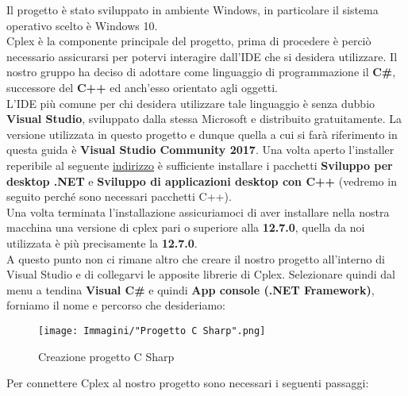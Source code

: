 \documentclass[11pt]{article}
\begin{document}
Il progetto è stato sviluppato in ambiente Windows, in particolare il sistema operativo scelto è Windows 10.\\
Cplex è la componente principale del progetto, prima di procedere è perciò necessario assicurarsi per potervi interagire dall'IDE che si desidera utilizzare. Il nostro gruppo ha deciso di adottare come linguaggio di programmazione il \textbf{C\#}, successore del \textbf{C++} ed anch'esso orientato agli oggetti.\\
L'IDE più comune per chi desidera utilizzare tale linguaggio è senza dubbio \textbf{Visual Studio}, sviluppato dalla stessa Microsoft e distribuito gratuitamente. La versione utilizzata in questo progetto e dunque quella a cui si farà riferimento in questa guida è \textbf{Visual Studio Community 2017}. Una volta aperto l'installer reperibile al seguente \href{https://www.visualstudio.com/it/thank-you-downloading-visual-studio/?sku=Community&rel=15#}{indirizzo} è sufficiente installare i pacchetti \textbf{Sviluppo per desktop .NET} e \textbf{Sviluppo di applicazioni desktop con C++} (vedremo in seguito perché sono necessari pacchetti C++).\\
Una volta terminata l'installazione assicuriamoci di aver installare nella nostra macchina una versione di cplex pari o superiore alla \textbf{12.7.0}, quella da noi utilizzata è più precisamente la \textbf{12.7.0}.\\
A questo punto non ci rimane altro che creare il nostro progetto all'interno di Visual Studio e di collegarvi le apposite librerie di Cplex. Selezionare quindi dal menu a tendina \textbf{Visual C\#} e quindi \textbf{App console (.NET Framework)}, forniamo il nome e percorso che desideriamo:

\begin{figure}[htbp]
    \centering
    \texttt{[image: Immagini/"Progetto C Sharp".png]}
    \caption{Creazione progetto C Sharp}
\end{figure}

Per connettere Cplex al nostro progetto sono necessari i seguenti passaggi:
\end{document}
